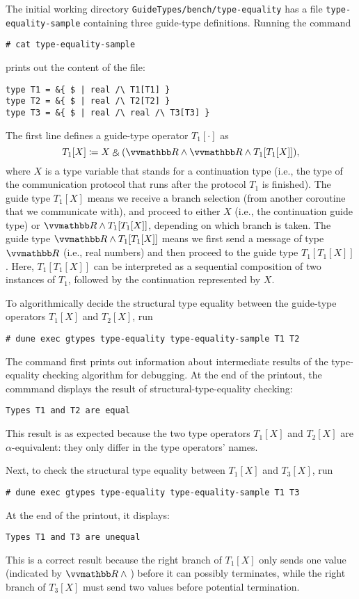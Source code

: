 The initial working directory \texttt{GuideTypes/bench/type-equality} has a file
\texttt{type-equality-sample} containing three guide-type definitions.
%
Running the command
\begin{verbatim}
# cat type-equality-sample
\end{verbatim}
prints out the content of the file:
\begin{verbatim}
type T1 = &{ $ | real /\ T1[T1] }
type T2 = &{ $ | real /\ T2[T2] }
type T3 = &{ $ | real /\ real /\ T3[T3] }
\end{verbatim}
%
The first line defines a guide-type operator $T_1 [\cdot]$ as
\begin{equation*}
  T_1 [X] \coloneq X \echoice (\treal \land \treal \land T_1 [T_1[X]]),
\end{equation*}
where $X$ is a type variable that stands for a continuation type (i.e., the type
of the communication protocol that runs after the protocol $T_1$ is finished).
%
The guide type $T_1 [X]$ means we receive a branch selection (from another
coroutine that we communicate with), and proceed to either $X$ (i.e., the
continuation guide type) or $\treal \land T_1 [T_1[X]]$, depending on which
branch is taken.
%
The guide type $\treal \land T_1 [T_1[X]]$ means we first send a message of type
$\treal$ (i.e., real numbers) and then proceed to the guide type $T_1 [T_1
[X]]$.
%
Here, $T_1 [T_1 [X]]$ can be interpreted as a sequential composition of two
instances of $T_1$, followed by the continuation represented by $X$.

To algorithmically decide the structural type equality between the guide-type
operators $T_1 [X]$ and $T_2 [X]$, run
\begin{verbatim}
# dune exec gtypes type-equality type-equality-sample T1 T2
\end{verbatim}
%
The command first prints out information about intermediate results of the
type-equality checking algorithm for debugging.
%
At the end of the printout, the commmand displays the result of
structural-type-equality checking:
\begin{verbatim}
Types T1 and T2 are equal
\end{verbatim}
%
This result is as expected because the two type operators $T_1 [X]$ and $T_2
  [X]$ are $\alpha$-equivalent: they only differ in the type operators' names.

Next, to check the structural type equality between $T_1 [X]$ and $T_3 [X]$, run
\begin{verbatim}
# dune exec gtypes type-equality type-equality-sample T1 T3
\end{verbatim}
%
At the end of the printout, it displays:
\begin{verbatim}
Types T1 and T3 are unequal
\end{verbatim}
%
This is a correct result because the right branch of $T_1 [X]$ only sends one
value (indicated by $\treal \land {}$) before it can possibly terminates, while
the right branch of $T_3 [X]$ must send two values before potential termination.

